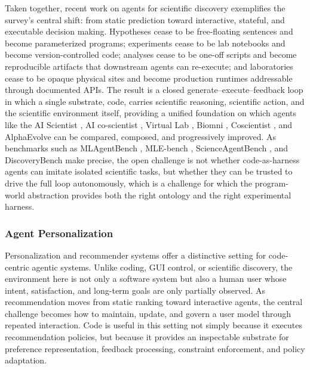 Taken together, recent work on agents for scientific discovery exemplifies the survey's central shift: from static prediction toward interactive, stateful, and executable decision making. Hypotheses cease to be free-floating sentences and become parameterized programs; experiments cease to be lab notebooks and become version-controlled code; analyses cease to be one-off scripts and become reproducible artifacts that downstream agents can re-execute; and laboratories cease to be opaque physical sites and become production runtimes addressable through documented APIs. The result is a closed generate–execute–feedback loop in which a single substrate, code, carries scientific reasoning, scientific action, and the scientific environment itself, providing a unified foundation on which agents like the AI Scientist \citep{lu2024aiscientistfullyautomated,yamada2025aiscientistv2workshoplevelautomated}, AI co-scientist \citep{gottweis2025aicoscientist}, Virtual Lab \citep{swanson2025virtual}, Biomni \citep{huang2025biomni}, Coscientist \citep{boiko2023autonomous}, and AlphaEvolve \citep{novikov2025alphaevolvecodingagentscientific} can be compared, composed, and progressively improved. As benchmarks such as MLAgentBench \citep{huang2024mlagentbenchevaluatinglanguageagents}, MLE-bench \citep{chan2025mlebenchevaluatingmachinelearning}, ScienceAgentBench \citep{chen2025scienceagentbenchrigorousassessmentlanguage}, and DiscoveryBench \citep{majumder2024discoverybenchdatadrivendiscoverylarge} make precise, the open challenge is not whether code-as-harness agents can imitate isolated scientific tasks, but whether they can be trusted to drive the full loop autonomously, which is a challenge for which the program-world abstraction provides both the right ontology and the right experimental harness.

\subsubsection{Agent Personalization}

Personalization and recommender systems offer a distinctive setting for code-centric agentic systems. Unlike coding, GUI control, or scientific discovery, the environment here is not only a software system but also a human user whose intent, satisfaction, and long-term goals are only partially observed. As recommendation moves from static ranking toward interactive agents, the central challenge becomes how to maintain, update, and govern a user model through repeated interaction. Code is useful in this setting not simply because it executes recommendation policies, but because it provides an inspectable substrate for preference representation, feedback processing, constraint enforcement, and policy adaptation.

